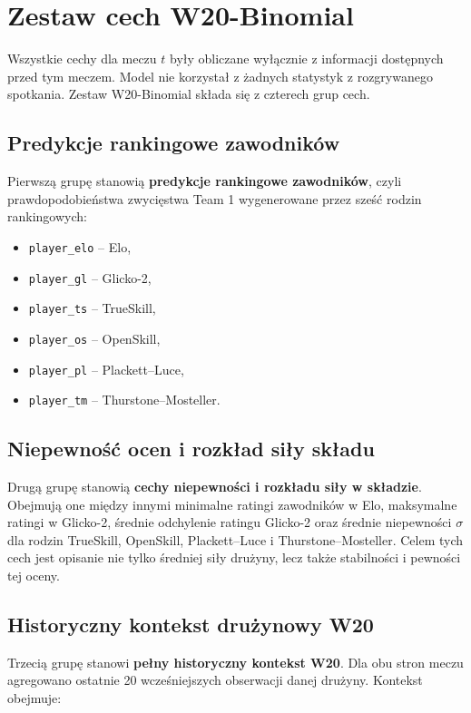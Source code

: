 \section{Zestaw cech W20-Binomial}

Wszystkie cechy dla meczu $t$ były obliczane wyłącznie z informacji dostępnych przed tym meczem. Model nie korzystał z żadnych statystyk z rozgrywanego spotkania. Zestaw W20-Binomial składa się z czterech grup cech.

\subsection{Predykcje rankingowe zawodników}

Pierwszą grupę stanowią \textbf{predykcje rankingowe zawodników}, czyli prawdopodobieństwa zwycięstwa Team 1 wygenerowane przez sześć rodzin rankingowych:

\begin{itemize}
    \item \texttt{player\_elo} -- Elo,
    \item \texttt{player\_gl} -- Glicko-2,
    \item \texttt{player\_ts} -- TrueSkill,
    \item \texttt{player\_os} -- OpenSkill,
    \item \texttt{player\_pl} -- Plackett--Luce,
    \item \texttt{player\_tm} -- Thurstone--Mosteller.
\end{itemize}

\subsection{Niepewność ocen i rozkład siły składu}

Drugą grupę stanowią \textbf{cechy niepewności i rozkładu siły w składzie}. Obejmują one między innymi minimalne ratingi zawodników w Elo, maksymalne ratingi w Glicko-2, średnie odchylenie ratingu Glicko-2 oraz średnie niepewności $\sigma$ dla rodzin TrueSkill, OpenSkill, Plackett--Luce i Thurstone--Mosteller. Celem tych cech jest opisanie nie tylko średniej siły drużyny, lecz także stabilności i pewności tej oceny.

\subsection{Historyczny kontekst drużynowy W20}

Trzecią grupę stanowi \textbf{pełny historyczny kontekst W20}. Dla obu stron meczu agregowano ostatnie 20 wcześniejszych obserwacji danej drużyny. Kontekst obejmuje:

